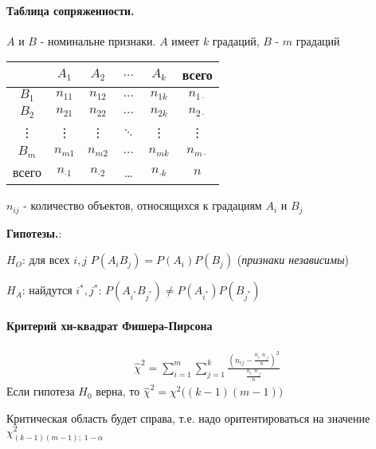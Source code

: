 \documentclass[12pt]{extarticle}
\begin{document}
\paragraph{Таблица сопряженности.}
$A$ и $B$ - номинальне признаки. $A$ имеет $k$ градаций, $B$ - $m$
градаций
\begin{center}\begin{tabular}{c|c|c|c|c|c}
            & $A_{1}$ & $A_{2}$ & $\ldots$ & $A_{k}$ & всего \\\hline
    $B_{1}$ & $n_{11}$ & $n_{12}$ & $\ldots$ & $n_{1k}$ & $n_{1\cdot}$\\\hline
    $B_{2}$ & $n_{21}$ & $n_{22}$ & $\ldots$ & $n_{2k}$ & $n_{2\cdot}$\\\hline
    \vdots  & \vdots &\vdots & $\ddots$ &\vdots & \vdots\\\hline
    $B_{m}$ & $n_{m1}$ & $n_{m2}$ & $\ldots$ & $n_{mk}$ & $n_{m\cdot}$\\\hline
    всего & $n_{\cdot 1}$ & $n_{\cdot 2}$ & \ldots & $n_{\cdot k}$ & $n$
\end{tabular}
\end{center}
$n_{ij}$ - количество объектов, относящихся к градациям $A_{i}$ и $B_{j}$

\par\textbf{Гипотезы.}:
\begin{description}
    \item $H_{O}$: для всех $i,j$ $P(A_{i}B_{j})=P(A_{i})P(B_{j})$
        (\textit{признаки независимы})
    \item $H_{A}$: найдутся
        $i^{*},j^{*}:\,P(A_{i^{*}}B_{j^{*}})\neq
        P(A_{i^{*}})P(B_{j^{*}})$
\end{description}

\paragraph{Критерий хи-квадрат Фишера-Пирсона}
\begin{eqnarray*}
    \hat{\chi}^{2}
    =\sum\limits_{i=1}^{m}\sum\limits_{j=1}^{k}
    \frac{\left(n_{ij}-\frac{n_{i\cdot}n_{\cdot j}}{n}\right)^{2}}
    {\frac{n_{i\cdot}n_{\cdot j}}{n}}
\end{eqnarray*}
Если гипотеза $H_{0}$ верна, то
$\hat{\chi}^{2}=\chi^{2}\big((k-1)(m-1)\big)$
\par Критическая область будет справа, т.е. надо оритентироваться на
значение $\chi^{2}_{(k-1)(m-1);\;1-\alpha}$
\end{document}
